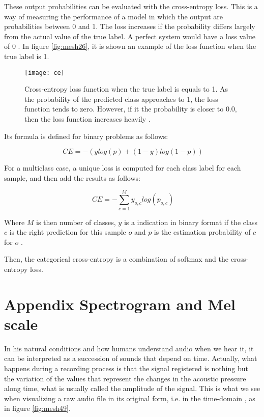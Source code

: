 	These output probabilities can be evaluated with the cross-entropy loss. This is a way of measuring the performance of a model in which the output are probabilities between 0 and 1. The loss increases if the probability differs largely from the actual value of the true label. A perfect system would have a loss value of 0 \cite{MLGlossary2017}. In figure \ref{fig:mesh26}, it is shown an example of the loss function when the true label is 1.
	
	\begin{figure}[H]
		\centering
		\captionsetup{justification=centering}
		\texttt{[image: ce]}
		\caption{Cross-entropy loss function when the true label is equals to 1. As the probability of the predicted class approaches to 1, the loss function tends to zero. However, if it the probability is closer to 0.0, then the loss function increases heavily \cite{MLGlossary2017}.}
	\end{figure}

	Its formula is defined for binary problems as follows:
	
	\[
	\ CE = -(ylog(p) + (1 - y)log(1 - p))
	\]

	For a multiclass case, a unique loss is computed for each class label for each sample, and then add the results as follows:
	
	\[
	\ CE = - \sum_{c=1}^{M} y_{o,c}log(p_{o,c})
	\]
	
	Where $M$ is then number of classes, $y$ is a indication in binary format if the class $c$ is the right prediction for this sample $o$ and $p$ is the estimation probability of $c$ for $o$ \cite{MLGlossary2017}. 
	
	Then, the categorical cross-entropy is a combination of softmax and the cross-entropy loss.
	
\chapter{Appendix Spectrogram and Mel scale}
\label{appendix:spectrogram-mel-scale}

	In his natural conditions and how humans understand audio when we hear it, it can be interpreted as a succession of sounds that depend on time. Actually, what happens during a recording process is that the signal registered is nothing but the variation of the values that represent the changes in the acoustic pressure along time, what is usually called the amplitude of the signal. This is what we see when visualizing a raw audio file in its original form, i.e. in the time-domain \cite{Laskaris2019}, as in figure \ref{fig:mesh49}.
	
